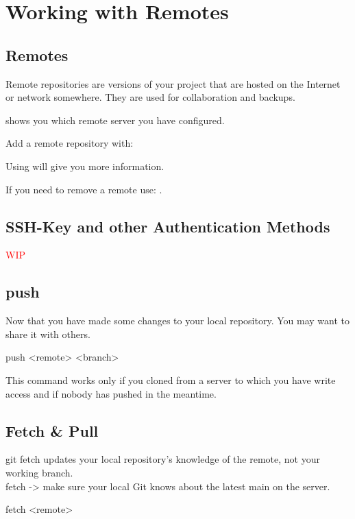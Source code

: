 \chapter{Working with Remotes}
\chapteroverlay
\chapterunderlay

\section{Remotes}
Remote repositories are versions of your project that are hosted on the Internet or network somewhere.
They are used for collaboration and backups.

\noindent{} shows you which remote server you have configured.

\noindent Add a remote repository with: 

\noindent Using  will give you more information.

\noindent If you need to remove a remote use: .

\section{SSH-Key and other Authentication Methods}

\textcolor{red}{WIP}

\section{push}
Now that you have made some changes to your local repository. You may want to share it with others.
\begin{gitBashBox}
push <remote> <branch>
\end{gitBashBox}
This command works only if you cloned from a server to which you have write access and if nobody has pushed in the meantime.
\section{Fetch \& Pull}
git fetch updates your local repository's knowledge of the remote, not your working branch.\\
fetch -> make sure your local Git knows about the latest main on the server.\\

\begin{gitBashBox}
fetch <remote>
\end{gitBashBox}

